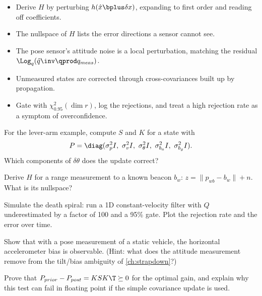 \begin{takeaways}
\begin{itemize}
  \item Derive $H$ by perturbing $h(\hat x\bplus\delta x)$, expanding to first order and reading off coefficients.
  \item The nullspace of $H$ lists the error directions a sensor cannot see.
  \item The pose sensor's attitude noise is a local perturbation, matching the residual $\Log_q(\hat q\inv\qprod q_{meas})$.
  \item Unmeasured states are corrected through cross-covariances built up by propagation.
  \item Gate with $\chi^2_{0.95}(\dim r)$, log the rejections, and treat a high rejection rate as a symptom of overconfidence.
\end{itemize}
\end{takeaways}

\begin{exercises}
  \item For the lever-arm example, compute $S$ and $K$ for a state with
        \[ P = \diag(\sigma_p^2I,\ \sigma_v^2I,\ \sigma_\theta^2I,\ \sigma_{b_a}^2I,\ \sigma_{b_g}^2I). \]
        Which components of $\delta\theta$ does the update correct?
  \item Derive $H$ for a range measurement to a known beacon $b_w$: $z = \|p_{wb} - b_w\| + n$. What is its nullspace?
  \item Simulate the death spiral: run a 1D constant-velocity filter with $Q$ underestimated by a factor of 100 and a
        95\% gate. Plot the rejection rate and the error over time.
  \item Show that with a pose measurement of a static vehicle, the horizontal accelerometer bias is observable.
        (Hint: what does the attitude measurement remove from the tilt/bias ambiguity of \cref{ch:strapdown}?)
  \item Prove that $P_{prior} - P_{post} = KSK\T \succeq 0$ for the optimal gain, and explain why this test can fail in floating
        point if the simple covariance update is used.
\end{exercises}

